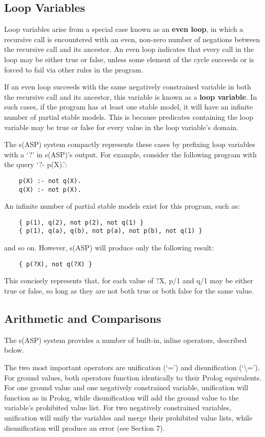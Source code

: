 \documentclass[]{article}
\begin{document}
\subsection{Loop Variables}

Loop variables arise from a special case known as an \textbf{even loop}, in which a
recursive call is encountered with an even, non-zero number of negations between
the recursive call and its ancestor. An even loop indicates that every call in
the loop may be either true or false, unless some element of the cycle succeeds
or is forced to fail via other rules in the program.

If an even loop succeeds with the same negatively constrained variable in both 
the recursive call and its ancestor, this variable is known as a \textbf{loop variable}. 
In such cases, if the program has at least one stable model, it will have an 
infinite number of partial stable models. This is because predicates containing 
the loop variable may be true or false for every value in the loop variable's 
domain.

The s(ASP) system compactly represents these cases by prefixing loop variables
with a `?' in s(ASP)'s output. For example, consider the following program with
the query `?- p(X).': 
\begin{verbatim}
    p(X) :- not q(X).
    q(X) :- not p(X).
\end{verbatim}
An infinite number of partial stable models exist for this program, such as:
\begin{verbatim}
    { p(1), q(2), not p(2), not q(1) }
    { p(1), q(a), q(b), not p(a), not p(b), not q(1) }
\end{verbatim}
and so on. However, s(ASP) will produce only the following result:
\begin{verbatim}
    { p(?X), not q(?X) }
\end{verbatim}
This concisely represents that, for each value of ?X, p/1 and q/1 may be either
true or false, so long as they are not both true or both false for the same
value.


\subsection{Arithmetic and Comparisons}

The s(ASP) system provides a number of built-in, inline operators, described
below.

The two most important operators are unification (`=') and disunification
(`\textbackslash ='). For ground values, both operators function identically to their Prolog
equivalents. For one ground value and one negatively constrained variable,
unification will function as in Prolog, while disunification will add the ground
value to the variable's prohibited value list. For two negatively constrained
variables, unification will unify the variables and merge their prohibited value
lists, while disunification will produce an error (see Section 7).
\end{document}
